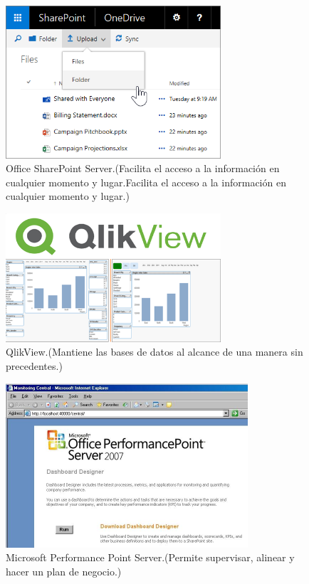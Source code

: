 \documentclass[a4paper,12pt,twocolumn]{article}
\begin{document}
\begin{figure}[h!]
\centering
\includegraphics[width=8cm]{./Imagenes/BIimagen5}
\caption{\label{fig:01}Office SharePoint Server.(Facilita el acceso a la información en cualquier momento y lugar.Facilita el acceso a la información en cualquier momento y lugar.)}
\end{figure}

\begin{figure}[h!]
\centering
\includegraphics[width=8cm]{./Imagenes/BIimagen6}
\caption{\label{fig:01}QlikView.(Mantiene las bases de datos al alcance de una manera sin precedentes.)}
\end{figure}

\begin{figure}[h!]
\centering
\includegraphics[width=9cm]{./Imagenes/BIimagen7}
\caption{\label{fig:01}Microsoft Performance Point Server.(Permite supervisar, alinear y hacer un plan de negocio.)}
\end{figure}
\end{document}

